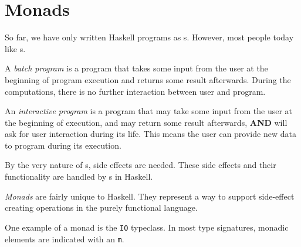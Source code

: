 \section{Monads}\label{sec:Monads}
So far, we have only written Haskell programs as s.
However, most people today like s.

\begin{definition}\label{def:Batch_Program}
  A \emph{batch program} is a program that takes some input from the user at the beginning of program execution and returns some result afterwards.
  During the computations, there is no further interaction between user and program.
\end{definition}

\begin{definition}\label{def:Interactive_Program}
  An \emph{interactive program} is a program that may take some input from the user at the beginning of execution, and may return some result afterwards, \textbf{AND} will ask for user interaction during its life.
  This means the user can provide new data to program during its execution.
\end{definition}

By the very nature of s, side effects are needed.
These side effects and their functionality are handled by s in Haskell.

\begin{definition}[Monad]\label{def:Monad}
  \emph{Monads} are fairly unique to Haskell.
  They represent a way to support side-effect creating operations in the purely functional language.

  One example of a monad is the \texttt{IO} typeclass.
  In most type signatures, monadic elements are indicated with an \texttt{m}.
\end{definition}

